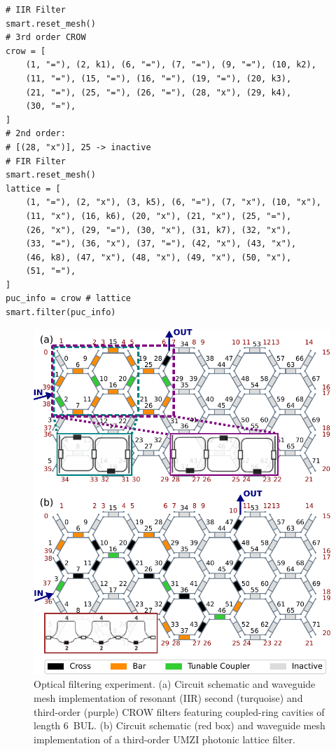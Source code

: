 \begin{lstlisting}[caption={Implementation of IIR and FIR optical filters using the first-generation Smartlight API}, label=lst:ch3-filters]
# IIR Filter 
smart.reset_mesh()
# 3rd order CROW
crow = [
    (1, "="), (2, k1), (6, "="), (7, "="), (9, "="), (10, k2),
    (11, "="), (15, "="), (16, "="), (19, "="), (20, k3),
    (21, "="), (25, "="), (26, "="), (28, "x"), (29, k4),
    (30, "="),
]
# 2nd order:
# [(28, "x")], 25 -> inactive
# FIR Filter 
smart.reset_mesh()
lattice = [
    (1, "="), (2, "x"), (3, k5), (6, "="), (7, "x"), (10, "x"),
    (11, "x"), (16, k6), (20, "x"), (21, "x"), (25, "="),
    (26, "x"), (29, "="), (30, "x"), (31, k7), (32, "x"),
    (33, "="), (36, "x"), (37, "="), (42, "x"), (43, "x"),
    (46, k8), (47, "x"), (48, "x"), (49, "x"), (50, "x"),
    (51, "="),
]
puc_info = crow # lattice 
smart.filter(puc_info)
\end{lstlisting}

\begin{figure}[t!]
	\begin{center}
		\includegraphics{figures/ch3-filters.pdf}
	\end{center}
	\caption{Optical filtering experiment.
		(a) Circuit schematic and waveguide mesh implementation of resonant (IIR) second (turquoise) and third-order (purple) CROW filters featuring coupled-ring cavities of length 6~BUL.
		(b) Circuit schematic (red box) and waveguide mesh implementation of a third-order UMZI photonic lattice filter.
	}\label{fig:ch3-filters}
\end{figure}

